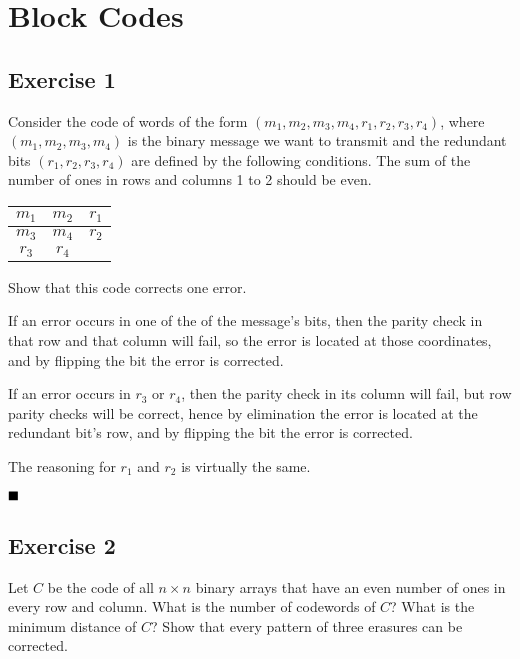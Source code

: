 \section{Block Codes}

\subsection{Exercise 1}

\begin{formulationBox}
	Consider the code of words of the form $(m_1, m_2, m_3, m_4, r_1, r_2, r_3, r_4)$, where $(m_1, m_2, m_3, m_4)$ is the binary message we want to transmit and the redundant bits $(r_1, r_2, r_3, r_4)$ are defined by the following conditions. The sum of the number of ones in rows and columns 1 to 2 should be even.
	
	\begin{center}
		\begin{tabular}{|c|c|c|}
			\hline
			$m_1$ & $m_2$ & $r_1$\\
			\hline
			$m_3$ & $m_4$ & $r_2$\\
			\hline
			$r_3$ & $r_4$ \\
			\cline{1-2}
		\end{tabular}
	\end{center}
	
	Show that this code corrects one error.
\end{formulationBox}

If an error occurs in one of the of the message's bits, then the parity check in that row and that column will fail, so the error is located at those coordinates, and by flipping the bit the error is corrected.

If an error occurs in $r_3$ or $r_4$, then the parity check in its column will fail, but row parity checks will be correct, hence by elimination the error is located at the redundant bit's row, and by flipping the bit the error is corrected.

The reasoning for $r_1$ and $r_2$ is virtually the same.

$\qed$

\subsection{Exercise 2}

\begin{formulationBox}
	Let $C$ be the code of all $n \times n$ binary arrays that have an even number of ones in every row and column. What is the number of codewords of $C$? What is the minimum distance of $C$? Show that every pattern of three erasures can be corrected.
\end{formulationBox}

